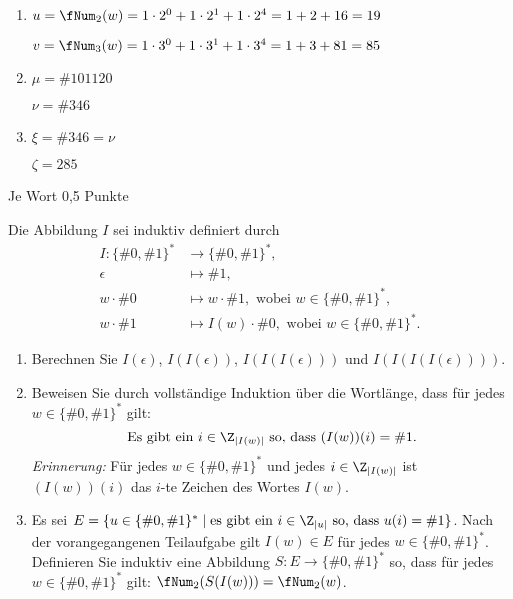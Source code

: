\documentclass[12pt]{article}
\begin{document}
\begin{loesung}
  \begin{enumerate}
    \item $u = \fNum_2(w) = 1 \cdot 2^0 + 1 \cdot 2^1 + 1 \cdot 2^4 = 1 + 2 + 16 = 19$

          $v = \fNum_3(w) = 1 \cdot 3^0 + 1 \cdot 3^1 + 1 \cdot 3^4 = 1 + 3 + 81 = 85$
    \item $\mu = \#{101120}$

          $\nu = \#{346}$


    \item $\xi = \#{346} = \nu$

          $\zeta = 285$
  \end{enumerate}
  \begin{korrektur}
    Je Wort 0,5 Punkte
  \end{korrektur}
\end{loesung}


\begin{aufgabe}[2 + 4 + 3 = 9]
  Die Abbildung $I$ sei induktiv definiert durch
  \begin{align*}
    I \colon \{\#0, \#1\}^* &\to     \{\#0, \#1\}^*,\\
                   \epsilon &\mapsto \#1,\\
                w \cdot \#0 &\mapsto w \cdot \#1, \text{ wobei } w \in \{\#0, \#1\}^*,\\
                w \cdot \#1 &\mapsto I(w) \cdot \#0, \text{ wobei } w \in \{\#0, \#1\}^*.
  \end{align*}
  \begin{enumerate}
    \item Berechnen Sie $I(\epsilon)$, $I(I(\epsilon))$, $I(I(I(\epsilon)))$ und $I(I(I(I(\epsilon))))$.
    \item Beweisen Sie durch vollständige Induktion über die Wortlänge, dass für jedes $w \in \{\#0, \#1\}^*$ gilt:
          \begin{equation*}
            \text{Es gibt ein } i \in \Z_{|I(w)|} \text{ so, dass } (I(w))(i) = \#1.
          \end{equation*}
          \emph{Erinnerung:} Für jedes $w \in \{\#0, \#1\}^*$ und jedes $i \in \Z_{|I(w)|}$ ist $(I(w))(i)$ das $i$-te Zeichen des Wortes $I(w)$.
    \item Es sei $E = \{u \in \{\#0, \#1\}^* \mid \text{es gibt ein } i \in \Z_{|u|} \text{ so, dass } u(i) = \#1\}$. Nach der vorangegangenen Teilaufgabe gilt $I(w) \in E$ für jedes $w \in \{\#0, \#1\}^*$. Definieren Sie induktiv eine Abbildung $S \colon E \to \{\#0, \#1\}^*$ so, dass für jedes $w \in \{\#0, \#1\}^*$ gilt: $\fNum_2(S(I(w))) = \fNum_2(w)$.
  \end{enumerate}
\end{aufgabe}
\end{document}
